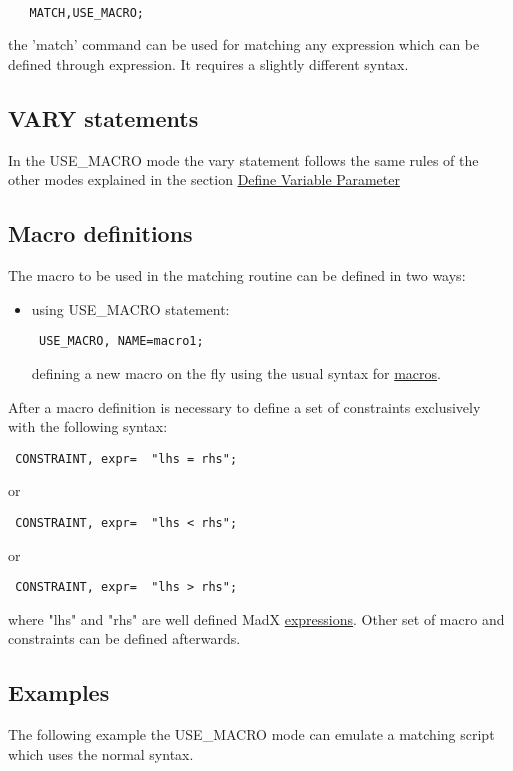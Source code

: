 \begin{verbatim}

   MATCH,USE_MACRO;
\end{verbatim}
 the 'match' command can be used for matching any expression which can be
 defined through expression. It requires a slightly different syntax.
 
 
 

\subsection{VARY statements}
 In the USE\_MACRO mode the vary statement follows the same rules of the other modes explained in the section \href{match_vary.html}{Define Variable Parameter}

\subsection{Macro definitions}
 The macro to be used in the matching routine can be defined in two ways:
 
\begin{itemize}
	\item 
   using USE\_MACRO statement:
   
\begin{verbatim}
 USE_MACRO, NAME=macro1;
  \end{verbatim}
   defining a new macro on the fly using the usual syntax for \href{../control/special.html#macro}{ macros}.
 
\end{itemize}
 After a macro definition is necessary to define a set of constraints exclusively with the following syntax:
 
\begin{verbatim}
 CONSTRAINT, expr=  "lhs = rhs"; \end{verbatim}
 or 
 
\begin{verbatim}
 CONSTRAINT, expr=  "lhs < rhs"; 
 \end{verbatim}
or
\begin{verbatim}
 CONSTRAINT, expr=  "lhs > rhs"; 
 \end{verbatim}

where "lhs" and "rhs" are well defined MadX \href{../Introduction/expression.html}{expressions}. Other set of macro and constraints can be defined afterwards.




\subsection{Examples}
The following example the USE\_MACRO mode can emulate a matching script which uses the normal syntax.


